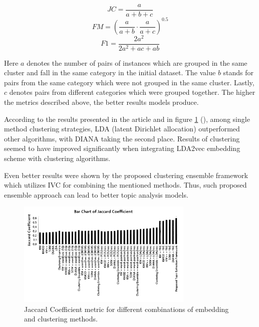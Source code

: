 \documentclass[3p,times,procedia]{elsarticle}
\begin{document}
\begin{equation} \label{eq:ta1}
JC = \frac{a}{a+b+c}
\end{equation}
\begin{equation} \label{eq:ta2}
FM = \left( \frac{a}{a+b} \cdot \frac{a}{a+c} \right)^{0.5}
\end{equation}
\begin{equation} \label{eq:ta3}
F1 = \frac{2a^2}{2a^2 + ac + ab}
\end{equation}

Here $a$ denotes the number of pairs of instances which are grouped in the same cluster and fall in the same category in the initial dataset. The value $b$ stands for pairs from the same category which were not grouped in the same cluster. Lastly, $c$ denotes pairs from different categories which were grouped together. The higher the metrics described above, the better results models produce.

According to the results presented in the article and in figure \ref{fig:gr1} (\cite{onan2019two}), among single method clustering strategies, LDA (latent Dirichlet allocation) outperformed other algorithms, with DIANA taking the second place. Results of clustering seemed to have improved significantly when integrating LDA2vec embedding scheme with clustering algorithms.

Even better results were shown by the proposed clustering ensemble framework which utilizes IVC for combining the mentioned methods. Thus, such proposed ensemble approach can lead to better topic analysis models.

\begin{figure}[!h]\vspace*{4pt}
	\centerline{\includegraphics[width=0.75\textwidth]{./visuals/gr1.pdf}}
\caption{Jaccard Coefficient metric for different combinations of embedding and clustering methods.}
\label{fig:gr1}
\end{figure}
\end{document}
